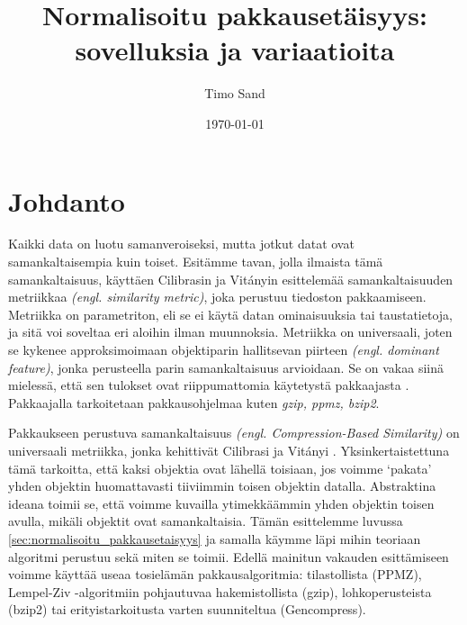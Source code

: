 \documentclass[12pt,finnish,final]{tktltiki2}
\title{Normalisoitu pakkausetäisyys: \\
sovelluksia ja variaatioita}
\author{Timo Sand}
\date{\today}
\theoremstyle{definition}
\theoremstyle{remark}
\newcommand{\engl}[1]{\emph{(engl. #1)}}
\begin{document}

\frontmatter      %

\maketitle        %
\makeabstract     %

\tableofcontents  %


\mainmatter       %

\section{Johdanto} %
\label{sec:johdanto}
\label{par:intro-1}
  Kaikki data on luotu samanveroiseksi, mutta jotkut datat ovat samankaltaisempia kuin toiset.
  Esitämme tavan, jolla ilmaista tämä samankaltaisuus, käyttäen Cilibrasin ja Vit{\'a}nyin esittelemää samankaltaisuuden metriikkaa \engl{similarity metric}, joka perustuu tiedoston pakkaamiseen. \cite{CV05}
  Metriikka on parametriton, eli se ei käytä datan ominaisuuksia tai taustatietoja, ja sitä voi soveltaa eri aloihin ilman muunnoksia.
  Metriikka on universaali, joten se kykenee approksimoimaan objektiparin hallitsevan piirteen \engl{dominant feature}, jonka perusteella parin samankaltaisuus arvioidaan.
  Se on vakaa siinä mielessä, että sen tulokset ovat riippumattomia käytetystä pakkaajasta \cite{CV05}. Pakkaajalla tarkoitetaan pakkausohjelmaa kuten \emph{gzip, ppmz, bzip2}.

  \label{par:intro-2}
  Pakkaukseen perustuva samankaltaisuus \engl{Compression-Based Similarity} on universaali metriikka, jonka kehittivät Cilibrasi ja Vit{\'a}nyi \cite{CV05}.
  Yksinkertaistettuna tämä tarkoitta, että kaksi objektia ovat lähellä toisiaan, jos voimme `pakata' yhden objektin huomattavasti tiiviimmin toisen objektin datalla.
  Abstraktina ideana toimii se, että voimme kuvailla ytimekkäämmin yhden objektin toisen avulla, mikäli objektit ovat samankaltaisia.
  Tämän esittelemme luvussa \ref{sec:normalisoitu_pakkausetaisyys} ja samalla käymme läpi mihin teoriaan algoritmi perustuu sekä miten se toimii.
  Edellä mainitun vakauden esittämiseen voimme käyttää useaa tosielämän pakkausalgoritmia: tilastollista (PPMZ), Lempel-Ziv -algoritmiin pohjautuvaa hakemistollista (gzip), lohkoperusteista (bzip2) tai erityistarkoitusta varten suunniteltua (Gencompress).
\end{document}
